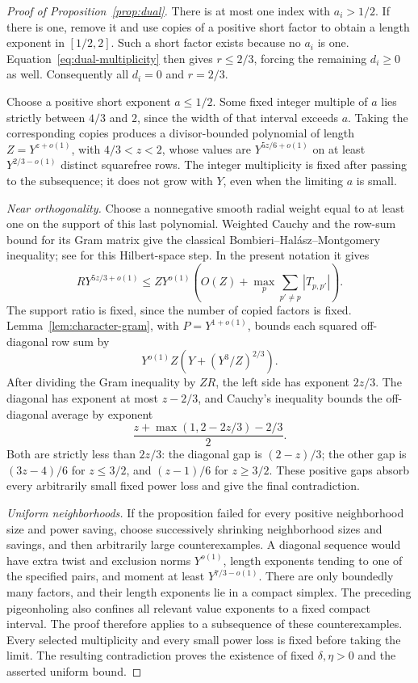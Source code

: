 \begin{proof}[Proof of Proposition~\ref{prop:dual}]
There is at most one index with $a_i>1/2$.  If there is one, remove
it and use copies of a positive short factor to obtain a length
exponent in $[1/2,2]$.  Such a short factor exists because no $a_i$
is one.  Equation~\eqref{eq:dual-multiplicity} then gives
$r\le2/3$, forcing the remaining $d_i\ge0$ as well.  Consequently
all $d_i=0$ and $r=2/3$.

Choose a positive short exponent $a\le1/2$.  Some fixed integer
multiple of $a$ lies strictly between $4/3$ and $2$, since the
width of that interval exceeds $a$.  Taking the corresponding
copies produces a divisor-bounded polynomial of length
$Z=Y^{z+o(1)}$, with $4/3<z<2$, whose values are
$Y^{5z/6+o(1)}$ on at least $Y^{2/3-o(1)}$ distinct squarefree rows.
The integer multiplicity is fixed after passing to the subsequence;
it does not grow with $Y$, even when the limiting $a$ is small.

\smallskip
\noindent\emph{Near orthogonality.}
Choose a nonnegative smooth radial weight equal to at least one on
the support of this last polynomial.  Weighted Cauchy and the
row-sum bound for its Gram matrix give the classical
Bombieri--Hal\'asz--Montgomery inequality; see
\cite[Theorem~1, equation~(1)]{HarcosBHM} for this Hilbert-space step.
In the present notation it gives
\[
 RY^{5z/3+o(1)}
 \le ZY^{o(1)}
       \left(O(Z)+\max_p\sum_{p'\ne p}|T_{p,p'}|\right).
\]
The support ratio is fixed, since the number of copied factors is
fixed.  Lemma~\ref{lem:character-gram}, with
$P=Y^{1+o(1)}$, bounds each squared off-diagonal row sum by
\[
 Y^{o(1)}Z\left(Y+(Y^3/Z)^{2/3}\right).
\]
After dividing the Gram inequality by $ZR$, the left side has
exponent $2z/3$.  The diagonal has exponent at most $z-2/3$, and
Cauchy's inequality bounds the off-diagonal average by exponent
\[
 \frac{z+\max(1,2-2z/3)-2/3}{2}.
\]
Both are strictly less than $2z/3$: the diagonal gap is $(2-z)/3$;
the other gap is $(3z-4)/6$ for $z\le3/2$, and $(z-1)/6$ for
$z\ge3/2$.  These positive gaps absorb every arbitrarily small
fixed power loss and give the final contradiction.

\smallskip
\noindent\emph{Uniform neighborhoods.}
If the proposition failed for every positive neighborhood size and
power saving, choose successively shrinking neighborhood sizes and
savings, and then arbitrarily large counterexamples.  A diagonal
sequence would have extra twist and exclusion norms $Y^{o(1)}$,
length exponents tending to one of the specified pairs, and moment
at least $Y^{7/3-o(1)}$.  There are only boundedly many factors, and
their length exponents lie in a compact simplex.  The preceding
pigeonholing also confines all relevant value exponents to a fixed
compact interval.  The proof therefore applies to a subsequence of
these counterexamples.  Every selected multiplicity and every
small power loss is fixed before taking the limit.  The resulting
contradiction proves the existence of fixed $\delta,\eta>0$ and
the asserted uniform bound.
\end{proof}
